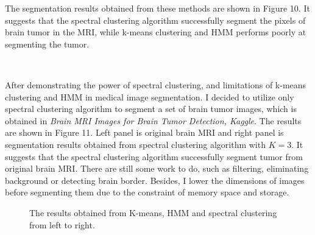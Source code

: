 \documentclass[a4paper]{article}
\begin{document}
The segmentation results obtained from these methods are shown in Figure 10. It suggests that the spectral clustering algorithm successfully segment the pixels of brain tumor in the MRI, while k-means clustering and HMM performs poorly at segmenting the tumor. 


\


After demonstrating the power of spectral clustering, and limitations of k-means clustering and HMM in medical image segmentation. I decided to utilize only spectral clustering algorithm to segment a set of brain tumor images, which is obtained in \textit{Brain MRI Images for Brain Tumor Detection, Kaggle}. The results are shown in Figure 11. Left panel is original brain MRI and right panel is segmentation results obtained from spectral clustering algorithm with $K = 3$. It suggests that the spectral clustering algorithm successfully segment tumor from original brain MRI. There are still some work to do, such as filtering, eliminating background or detecting brain border. Besides, I lower the dimensions of images before segmenting them due to the constraint of memory space and storage.


\begin{figure}[h!]%
    \centering
    \caption{The results obtained from K-means, HMM and spectral clustering from left to right.}
\end{figure}
\end{document}
